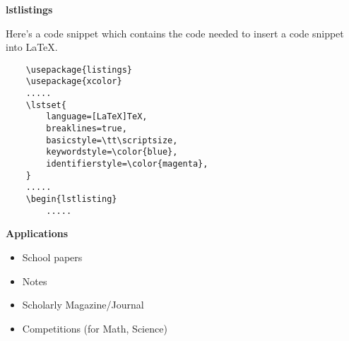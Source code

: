 \documentclass[a4paper,12pt]{article}
\begin{document}
\newpage
\begin{center}
	\bf{\Huge{lstlistings}}
\end{center}
\bigskip
Here's a code snippet which contains the code needed to insert a code snippet into LaTeX.
\begin{lstlisting}
	\usepackage{listings}
	\usepackage{xcolor}
	.....
	\lstset{
		language=[LaTeX]TeX,
		breaklines=true,
		basicstyle=\tt\scriptsize,
		keywordstyle=\color{blue},
		identifierstyle=\color{magenta},
	}
	.....
	\begin{lstlisting}
		.....
\end{lstlisting}

\newpage
\begin{center}
  \bf{\Huge{Applications}}
\end{center}
\bigskip

\begin{itemize}
  \item School papers
  \item Notes
  \item Scholarly Magazine/Journal
  \item Competitions (for Math, Science)
\end{itemize}
\end{document}
